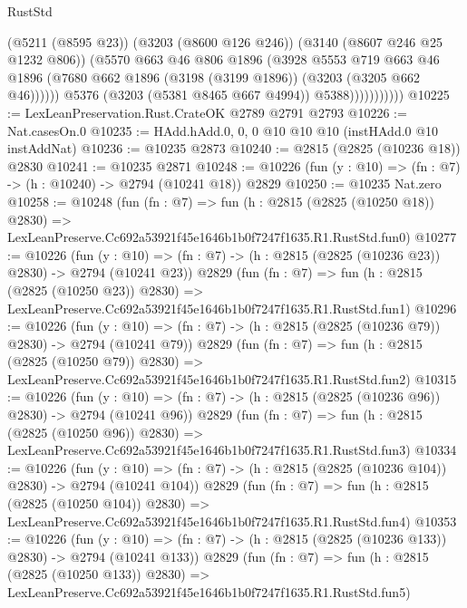 \begin{lexlean}{RustStd}
\begin{coremodule}
                            (@5211 (@8595 @23))
                            (@3203 (@8600 @126 @246))
                            (@3140 (@8607 @246 @25 @1232 @806))
                            (@5570
                              @663
                              @46
                              @806
                              @1896
                              (@3928
                                @5553
                                @719
                                @663
                                @46
                                @1896
                                (@7680 @662 @1896 (@3198 (@3199 @1896)) (@3203 (@3205 @662 @46))))))
                          @5376
                          (@3203 (@5381 @8465 @667 @4994))
                          @5388)))))))))))
@10225 := LexLeanPreservation.Rust.CrateOK @2789 @2791 @2793
@10226 := Nat.casesOn.{0}
@10235 := HAdd.hAdd.{0, 0, 0} @10 @10 @10 (instHAdd.{0} @10 instAddNat)
@10236 := @10235 @2873
@10240 := @2815 (@2825 (@10236 @18)) @2830
@10241 := @10235 @2871
@10248 := @10226 (fun (y : @10) => (fn : @7) -> (h : @10240) -> @2794 (@10241 @18)) @2829
@10250 := @10235 Nat.zero
@10258 := @10248
    (fun (fn : @7) =>
    fun (h : @2815 (@2825 (@10250 @18)) @2830) =>
    LexLeanPreserve.Cc692a53921f45e1646b1b0f7247f1635.R1.RustStd.fun0)
@10277 := @10226
    (fun (y : @10) => (fn : @7) -> (h : @2815 (@2825 (@10236 @23)) @2830) -> @2794 (@10241 @23))
    @2829
    (fun (fn : @7) =>
    fun (h : @2815 (@2825 (@10250 @23)) @2830) =>
    LexLeanPreserve.Cc692a53921f45e1646b1b0f7247f1635.R1.RustStd.fun1)
@10296 := @10226
    (fun (y : @10) => (fn : @7) -> (h : @2815 (@2825 (@10236 @79)) @2830) -> @2794 (@10241 @79))
    @2829
    (fun (fn : @7) =>
    fun (h : @2815 (@2825 (@10250 @79)) @2830) =>
    LexLeanPreserve.Cc692a53921f45e1646b1b0f7247f1635.R1.RustStd.fun2)
@10315 := @10226
    (fun (y : @10) => (fn : @7) -> (h : @2815 (@2825 (@10236 @96)) @2830) -> @2794 (@10241 @96))
    @2829
    (fun (fn : @7) =>
    fun (h : @2815 (@2825 (@10250 @96)) @2830) =>
    LexLeanPreserve.Cc692a53921f45e1646b1b0f7247f1635.R1.RustStd.fun3)
@10334 := @10226
    (fun (y : @10) => (fn : @7) -> (h : @2815 (@2825 (@10236 @104)) @2830) -> @2794 (@10241 @104))
    @2829
    (fun (fn : @7) =>
    fun (h : @2815 (@2825 (@10250 @104)) @2830) =>
    LexLeanPreserve.Cc692a53921f45e1646b1b0f7247f1635.R1.RustStd.fun4)
@10353 := @10226
    (fun (y : @10) => (fn : @7) -> (h : @2815 (@2825 (@10236 @133)) @2830) -> @2794 (@10241 @133))
    @2829
    (fun (fn : @7) =>
    fun (h : @2815 (@2825 (@10250 @133)) @2830) =>
    LexLeanPreserve.Cc692a53921f45e1646b1b0f7247f1635.R1.RustStd.fun5)

\end{coremodule}
\end{lexlean}
